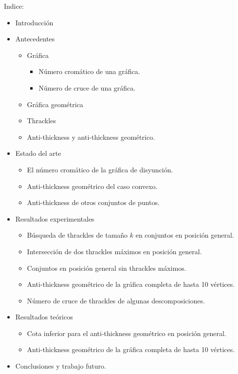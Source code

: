 \documentclass[12pt, letterpaper]{article}
\begin{document}
Indice:
\begin{itemize}
  \item Introducción
  \item Antecedentes
    \begin{itemize}
      \item Gráfica
      \begin{itemize}
        \item Número cromático de una gráfica.
        \item Número de cruce de una gráfica.
      \end{itemize}
      \item Gráfica geométrica
      \item Thrackles
      \item Anti-thickness y anti-thickness geométrico.
    \end{itemize}
  \item Estado del arte
    \begin{itemize}
      \item El número cromático de la gráfica de disyunción.
      \item Anti-thickness geométrico del caso convexo.
      \item Anti-thickness de otros conjuntos de puntos.
    \end{itemize}
  \item Resultados experimentales
    \begin{itemize}
      \item Búsqueda de thrackles de tamaño $k$ en conjuntos en posición general.
      \item Intersección de dos thrackles máximos en posición general.
      \item Conjuntos en posición general sin thrackles máximos.
      \item Anti-thickness geométrico de la gráfica completa de hasta 10 vértices.
      \item Número de cruce de thrackles de algunas descomposiciones.
    \end{itemize}
  \item Resultados teóricos
    \begin{itemize}
      \item Cota inferior para el anti-thickness geométrico en posición general.
      \item Anti-thickness geométrico de la gráfica completa de hasta 10 vértices.
    \end{itemize}
  \item Conclusiones y trabajo futuro.
\end{itemize}
\end{document}
